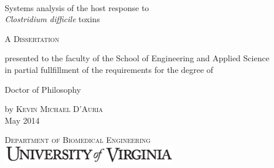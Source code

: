 \begin{titlepage}
\begin{caslonpro}


\center 

~~~

\vspace{0.5in}

{ \Huge Systems analysis of the host response to \\[0.1in]
      \emph{Clostridium difficile} toxins }\\[0.4cm] 
               
\vspace{0.9in}
       

\textsc{\LARGE A Dissertation}\\[0.3in] %

\vspace{0.6in}

presented to the faculty of the School
of Engineering and Applied Science \\
in partial fullfillment of the
requirements for the degree of

\vspace{0.3in} 

\Large Doctor of Philosophy

\vspace{1.3in}

by \textsc{ \huge Kevin Michael D'Auria } \\[0.05in]
\large May 2014

\vspace{1.4in}

\textsc{\Large Department of Biomedical Engineering}\\[0.1in] 
\includegraphics[width=3in]{TitlePage/uvaname.pdf}\\[0.02in]

\end{caslonpro}
\end{titlepage}



